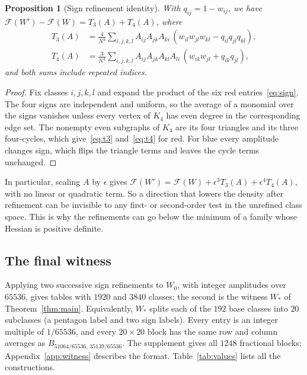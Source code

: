 \documentclass[11pt]{article}
\newtheorem{proposition}[theorem]{Proposition}
\theoremstyle{definition}
\theoremstyle{remark}
\newcommand{\F}{\mathcal F}
\begin{document}
\begin{proposition}[Sign refinement identity]
\label{prop:sign}
With $q_{ij}=1-w_{ij}$, we have $\F(W')-\F(W)=T_3(A)+T_4(A)$, where
\begin{align}
\label{eq:t3}
 T_3(A)&=\frac4{N^4}\sum_{i,j,k,l}A_{ij}A_{jk}A_{ki}\,(w_{il}w_{jl}w_{kl}-q_{il}q_{jl}q_{kl}),\\
\label{eq:t4}
 T_4(A)&=\frac3{N^4}\sum_{i,j,k,l}A_{ij}A_{jk}A_{kl}A_{li}\,(w_{ik}w_{jl}+q_{ik}q_{jl}),
\end{align}
and both sums include repeated indices.
\end{proposition}
\begin{proof}
Fix classes $i,j,k,l$ and expand the product of the six red entries~\eqref{eq:sign}.
The four signs are independent and uniform, so the average of a monomial over the signs vanishes unless every vertex of $K_4$ has even degree in the corresponding edge set.
The nonempty even subgraphs of $K_4$ are its four triangles and its three four-cycles, which give~\eqref{eq:t3} and~\eqref{eq:t4} for red.
For blue every amplitude changes sign, which flips the triangle terms and leaves the cycle terms unchanged.
\end{proof}

In particular, scaling $A$ by $\epsilon$ gives $\F(W')=\F(W)+\epsilon^3T_3(A)+\epsilon^4T_4(A)$, with no linear or quadratic term.
So a direction that lowers the density after refinement can be invisible to any first- or second-order test in the unrefined class space.
This is why the refinements can go below the minimum of a family whose Hessian is positive definite.

\subsection{The final witness}

Applying two successive sign refinements to $W_0$, with integer amplitudes over $65536$, gives tables with $1920$ and $3840$ classes; the second is the witness $W_*$ of Theorem~\ref{thm:main}.
Equivalently, $W_*$ splits each of the $192$ base classes into $20$ subclasses (a pentagon label and two sign labels).
Every entry is an integer multiple of $1/65536$, and every $20\times20$ block has the same row and column averages as $B_{51064/65536,\,35139/65536}$.
The supplement gives all $1248$ fractional blocks; Appendix~\ref{app:witness} describes the format.
Table~\ref{tab:values} lists all the constructions.
\end{document}
